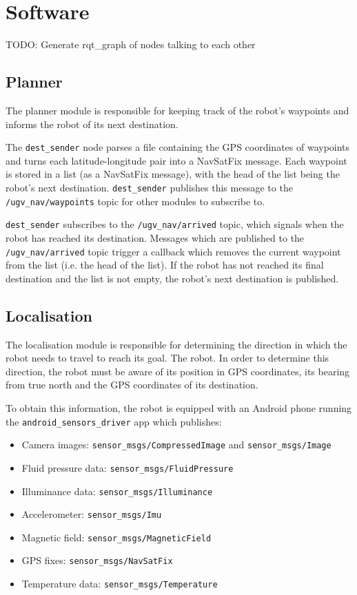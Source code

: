\documentclass[titlepage,12pt,a4paper]{article}
\begin{document}
\pagebreak
\section{Software}

TODO: Generate rqt\_graph of nodes talking to each other

\subsection{Planner}
The planner module is responsible for keeping track of the robot's waypoints and informs the robot of its next destination. 

The \verb|dest_sender| node parses a file containing the GPS coordinates of waypoints and turns each latitude-longitude pair into a NavSatFix message. Each waypoint is stored in a list (as a NavSatFix message), with the head of the list being the robot's next destination. \verb|dest_sender| publishes this message to the \verb|/ugv_nav/waypoints| topic for other modules to subscribe to.

\verb|dest_sender| subscribes to the \verb|/ugv_nav/arrived| topic, which signals when the robot has reached its destination. Messages which are published to the \verb|/ugv_nav/arrived| topic trigger a callback which removes the current waypoint from the list (i.e. the head of the list). If the robot has not reached its final destination and the list is not empty, the robot's next destination is published.

\subsection{Localisation}
The localisation module is responsible for determining the direction in which the robot needs to travel to reach its goal. The robot. In order to determine this direction, the robot must be aware of its position in GPS coordinates, its bearing from true north and the GPS coordinates of its destination.

To obtain this information, the robot is equipped with an Android phone running the \verb|android_sensors_driver| app which publishes:

\begin{itemize}
	\item Camera images: \verb|sensor_msgs/CompressedImage| and \verb|sensor_msgs/Image|
	\item Fluid pressure data: \verb|sensor_msgs/FluidPressure|
	\item Illuminance data: \verb|sensor_msgs/Illuminance|
	\item Accelerometer: \verb|sensor_msgs/Imu|
	\item Magnetic field: \verb|sensor_msgs/MagneticField|
	\item GPS fixes: \verb|sensor_msgs/NavSatFix|
	\item Temperature data: \verb|sensor_msgs/Temperature| \\
\end{itemize}
\end{document}
